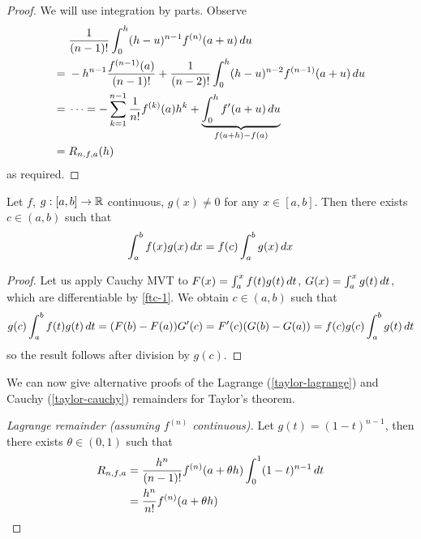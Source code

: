 \documentclass{../../template/note}
\begin{document}
    \begin{proof}
        We will use integration by parts. Observe
        \begin{align*}
            &\; \frac{1}{(n-1)!} \int_0^h (h-u)^{n-1} f^{(n)}(a+u) \,d{u} \\
            =&\; -h^{n-1} \frac{f^{(n-1)}(a)}{(n-1)!} + \frac{1}{(n-2)!} \int_0^h (h-u)^{n-2} f^{(n-1)}(a+u) \,d{u} \\
            =&\; \dots = -\sum_{k=1}^{n-1} \frac 1 {n!} f^{(k)}(a) h^k + \underbrace{\int_0^h f'(a+u) \,d{u}}_{f(a+h)-f(a)} \\
            =&\; R_{n,f,a}(h)
        \end{align*}
        as required.        
    \end{proof}
    
    \begin{proposition}
        Let \(f\), \(g: [a, b] \to \mathbb R\) continuous, \(g(x) \neq 0\) for any \(x \in [a, b]\). Then there exists \(c \in (a, b)\) such that
        \begin{align*}
            \int_a^b f(x)g(x) \,d{x} = f(c) \int_a^b g(x) \,d{x}
        \end{align*}
    \end{proposition}
    
    \begin{proof}
        Let us apply Cauchy MVT to \(F(x) = \int_a^x f(t)g(t) \,d{t}\), \(G(x) = \int_a^x g(t) \,d{t}\), which are differentiable by \cref{ftc-1}. We obtain \(c \in (a, b)\) such that
        \begin{align*}
            g(c) \int_a^b f(t)g(t) \,d{t} = (F(b)-F(a))G'(c) = F'(c)(G(b)-G(a)) = f(c)g(c) \int_a^b g(t) \,d{t}
        \end{align*}
        so the result follows after division by \(g(c)\).        
    \end{proof}
    
    We can now give alternative proofs of the Lagrange (\cref{taylor-lagrange}) and Cauchy (\cref{taylor-cauchy}) remainders for Taylor's theorem.

    \begin{proof}[Lagrange remainder (\emph{assuming \(f^{(n)}\) continuous})]
        Let \(g(t) = (1-t)^{n-1}\), then there exists \(\theta \in (0, 1)\) such that
        \begin{align*}
            R_{n,f,a} &= \frac{h^n}{(n-1)!} f^{(n)}(a + \theta h) \int_0^1 (1-t)^{n-1} \,d{t} \\
            &= \frac{h^n}{n!} f^{(n)}(a+\theta h)
        \end{align*}
    \end{proof}
    
\end{document}
